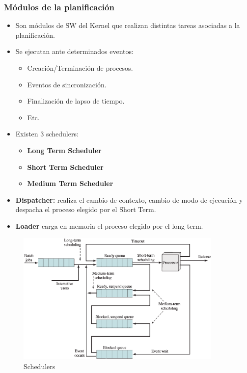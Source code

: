 \subsubsection{Módulos de la planificación}
\begin{itemize}
    \item Son módulos de SW del Kernel que realizan distintas tareas asociadas a la planificación.
    \item Se ejecutan ante determinados eventos:
    \begin{itemize}
        \item Creación/Terminación de procesos.
        \item Eventos de sincronización.
        \item Finalización de lapso de tiempo.
        \item Etc.
    \end{itemize}
    \item Existen 3 schedulers:
        \begin{itemize}
            \item \textbf{Long Term Scheduler} 
            \item \textbf{Short Term Scheduler} 
            \item \textbf{Medium Term Scheduler} 
        \end{itemize}
    \item \textbf{Dispatcher:} realiza el cambio de contexto, cambio de modo de ejecución y despacha el proceso elegido por el Short Term.
    \item \textbf{Loader} carga en memoria el proceso elegido por el long term.
\end{itemize}
\begin{figure}[h]
    \begin{center}
        \includegraphics[width=0.90\textwidth]{assets/Schedulers.eps}
    \end{center}
    \caption{Schedulers}\label{fig:}
\end{figure}


